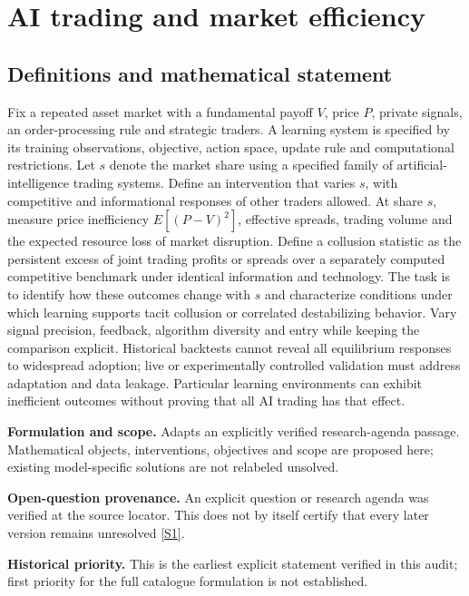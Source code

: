 \documentclass[11pt]{article}
\newcommand{\sref}[2]{\hyperlink{source:#1:#2}{[S#2]}}
\begin{document}
\section*{AI trading and market efficiency}\label{30007601}
\subsection{Definitions and mathematical statement}
Fix a repeated asset market with a fundamental payoff \(V\), price \(P\), private signals, an order-processing rule and strategic traders. A learning system is specified by its training observations, objective, action space, update rule and computational restrictions. Let \(s\) denote the market share using a specified family of artificial-intelligence trading systems. Define an intervention that varies \(s\), with competitive and informational responses of other traders allowed. At share \(s\), measure price inefficiency \(E[(P-V)^2]\), effective spreads, trading volume and the expected resource loss of market disruption. Define a collusion statistic as the persistent excess of joint trading profits or spreads over a separately computed competitive benchmark under identical information and technology. The task is to identify how these outcomes change with \(s\) and characterize conditions under which learning supports tacit collusion or correlated destabilizing behavior. Vary signal precision, feedback, algorithm diversity and entry while keeping the comparison explicit. Historical backtests cannot reveal all equilibrium responses to widespread adoption; live or experimentally controlled validation must address adaptation and data leakage. Particular learning environments can exhibit inefficient outcomes without proving that all AI trading has that effect.

\par\textbf{Formulation and scope.} Adapts an explicitly verified research-agenda passage. Mathematical objects, interventions, objectives and scope are proposed here; existing model-specific solutions are not relabeled unsolved.

\par\textbf{Open-question provenance.} An explicit question or research agenda was verified at the source locator. This does not by itself certify that every later version remains unresolved \sref{30007601}{1}.

\par\textbf{Historical priority.} This is the earliest explicit statement verified in this audit; first priority for the full catalogue formulation is not established.
\end{document}
